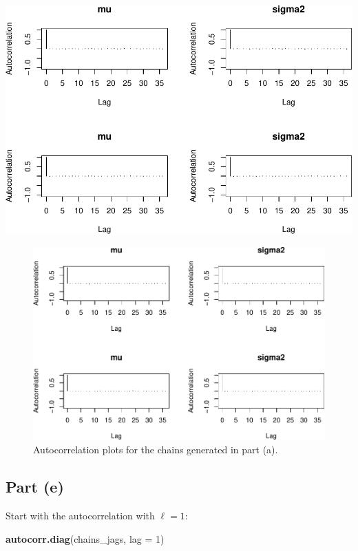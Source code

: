 \documentclass[
]{homework}
\newenvironment{Shaded}{\begin{snugshade}}{\end{snugshade}}
\newcommand{\AttributeTok}[1]{\textcolor[rgb]{0.13,0.29,0.53}{#1}}
\newcommand{\DecValTok}[1]{\textcolor[rgb]{0.00,0.00,0.81}{#1}}
\newcommand{\FunctionTok}[1]{\textcolor[rgb]{0.13,0.29,0.53}{\textbf{#1}}}
\newcommand{\NormalTok}[1]{#1}
\begin{document}
\begin{center}\includegraphics[width=0.75\linewidth]{finalexam_files/figure-latex/unnamed-chunk-6-1} \end{center}

\begin{figure}

{\centering \includegraphics[width=0.75\linewidth]{finalexam_files/figure-latex/ex2-autocorr-plots-1} 

}

\caption{Autocorrelation plots for the chains generated in part (a).}\label{fig:ex2-autocorr-plots}
\end{figure}

\newpage

\subsection{Part (e)}\label{part-e}

Start with the autocorrelation with \(\ell = 1\):

\begin{Shaded}
\begin{Highlighting}[]
\FunctionTok{autocorr.diag}\NormalTok{(chains\_jags, }\AttributeTok{lag =} \DecValTok{1}\NormalTok{)}
\end{Highlighting}
\end{Shaded}
\end{document}
